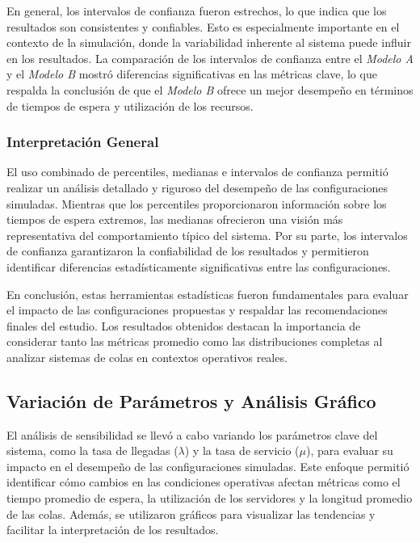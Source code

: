 \documentclass[a4paper,12pt]{article}
\begin{document}
En general, los intervalos de confianza fueron estrechos, lo que indica que los resultados son consistentes y confiables. Esto es especialmente importante en el contexto de la simulación, donde la variabilidad inherente al sistema puede influir en los resultados. La comparación de los intervalos de confianza entre el \textit{Modelo A} y el \textit{Modelo B} mostró diferencias significativas en las métricas clave, lo que respalda la conclusión de que el \textit{Modelo B} ofrece un mejor desempeño en términos de tiempos de espera y utilización de los recursos.

\subsubsection{Interpretación General}

El uso combinado de percentiles, medianas e intervalos de confianza permitió realizar un análisis detallado y riguroso del desempeño de las configuraciones simuladas. Mientras que los percentiles proporcionaron información sobre los tiempos de espera extremos, las medianas ofrecieron una visión más representativa del comportamiento típico del sistema. Por su parte, los intervalos de confianza garantizaron la confiabilidad de los resultados y permitieron identificar diferencias estadísticamente significativas entre las configuraciones.

En conclusión, estas herramientas estadísticas fueron fundamentales para evaluar el impacto de las configuraciones propuestas y respaldar las recomendaciones finales del estudio. Los resultados obtenidos destacan la importancia de considerar tanto las métricas promedio como las distribuciones completas al analizar sistemas de colas en contextos operativos reales.

\subsection{Variación de Parámetros y Análisis Gráfico}

El análisis de sensibilidad se llevó a cabo variando los parámetros clave del sistema, como la tasa de llegadas (\( \lambda \)) y la tasa de servicio (\( \mu \)), para evaluar su impacto en el desempeño de las configuraciones simuladas. Este enfoque permitió identificar cómo cambios en las condiciones operativas afectan métricas como el tiempo promedio de espera, la utilización de los servidores y la longitud promedio de las colas. Además, se utilizaron gráficos para visualizar las tendencias y facilitar la interpretación de los resultados.
\end{document}
